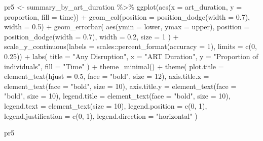 \documentclass[
  letterpaper,
  DIV=11,
  numbers=noendperiod]{scrartcl}
\newenvironment{Shaded}{\begin{snugshade}}{\end{snugshade}}
\newcommand{\AttributeTok}[1]{\textcolor[rgb]{0.40,0.45,0.13}{#1}}
\newcommand{\DecValTok}[1]{\textcolor[rgb]{0.68,0.00,0.00}{#1}}
\newcommand{\FloatTok}[1]{\textcolor[rgb]{0.68,0.00,0.00}{#1}}
\newcommand{\FunctionTok}[1]{\textcolor[rgb]{0.28,0.35,0.67}{#1}}
\newcommand{\NormalTok}[1]{\textcolor[rgb]{0.00,0.23,0.31}{#1}}
\newcommand{\OtherTok}[1]{\textcolor[rgb]{0.00,0.23,0.31}{#1}}
\newcommand{\SpecialCharTok}[1]{\textcolor[rgb]{0.37,0.37,0.37}{#1}}
\newcommand{\StringTok}[1]{\textcolor[rgb]{0.13,0.47,0.30}{#1}}
\begin{document}
\begin{Shaded}
\begin{Highlighting}[]
\NormalTok{pr5 }\OtherTok{\textless{}{-}}\NormalTok{ summary\_by\_art\_duration }\SpecialCharTok{\%\textgreater{}\%} 
\FunctionTok{ggplot}\NormalTok{(}\FunctionTok{aes}\NormalTok{(}\AttributeTok{x =}\NormalTok{ art\_duration, }\AttributeTok{y =}\NormalTok{ proportion, }\AttributeTok{fill =}\NormalTok{ time)) }\SpecialCharTok{+}
  \FunctionTok{geom\_col}\NormalTok{(}\AttributeTok{position =} \FunctionTok{position\_dodge}\NormalTok{(}\AttributeTok{width =} \FloatTok{0.7}\NormalTok{), }\AttributeTok{width =} \FloatTok{0.5}\NormalTok{) }\SpecialCharTok{+}
  \FunctionTok{geom\_errorbar}\NormalTok{(}
    \FunctionTok{aes}\NormalTok{(}\AttributeTok{ymin =}\NormalTok{ lower, }\AttributeTok{ymax =}\NormalTok{ upper),}
    \AttributeTok{position =} \FunctionTok{position\_dodge}\NormalTok{(}\AttributeTok{width =} \FloatTok{0.7}\NormalTok{),}
    \AttributeTok{width =} \FloatTok{0.2}\NormalTok{,}
    \AttributeTok{size =} \DecValTok{1}
\NormalTok{  ) }\SpecialCharTok{+}
  \FunctionTok{scale\_y\_continuous}\NormalTok{(}\AttributeTok{labels =}\NormalTok{ scales}\SpecialCharTok{::}\FunctionTok{percent\_format}\NormalTok{(}\AttributeTok{accuracy =} \DecValTok{1}\NormalTok{), }\AttributeTok{limits =} \FunctionTok{c}\NormalTok{(}\DecValTok{0}\NormalTok{, }\FloatTok{0.25}\NormalTok{)) }\SpecialCharTok{+}
  \FunctionTok{labs}\NormalTok{(}
    \AttributeTok{title =} \StringTok{"Any Disruption"}\NormalTok{,}
    \AttributeTok{x =} \StringTok{"ART Duration"}\NormalTok{,}
    \AttributeTok{y =} \StringTok{"Proportion of individuals"}\NormalTok{,}
    \AttributeTok{fill =} \StringTok{"Time"}
\NormalTok{  ) }\SpecialCharTok{+}
  \FunctionTok{theme\_minimal}\NormalTok{() }\SpecialCharTok{+}
  \FunctionTok{theme}\NormalTok{(}
    \AttributeTok{plot.title =} \FunctionTok{element\_text}\NormalTok{(}\AttributeTok{hjust =} \FloatTok{0.5}\NormalTok{, }\AttributeTok{face =} \StringTok{"bold"}\NormalTok{, }\AttributeTok{size =} \DecValTok{12}\NormalTok{),}
    \AttributeTok{axis.title.x =} \FunctionTok{element\_text}\NormalTok{(}\AttributeTok{face =} \StringTok{"bold"}\NormalTok{, }\AttributeTok{size =} \DecValTok{10}\NormalTok{),}
    \AttributeTok{axis.title.y =} \FunctionTok{element\_text}\NormalTok{(}\AttributeTok{face =} \StringTok{"bold"}\NormalTok{, }\AttributeTok{size =} \DecValTok{10}\NormalTok{),}
    \AttributeTok{legend.title =} \FunctionTok{element\_text}\NormalTok{(}\AttributeTok{face =} \StringTok{"bold"}\NormalTok{, }\AttributeTok{size =} \DecValTok{10}\NormalTok{),}
    \AttributeTok{legend.text =} \FunctionTok{element\_text}\NormalTok{(}\AttributeTok{size =} \DecValTok{10}\NormalTok{),}
    \AttributeTok{legend.position =} \FunctionTok{c}\NormalTok{(}\DecValTok{0}\NormalTok{, }\DecValTok{1}\NormalTok{), }
    \AttributeTok{legend.justification =} \FunctionTok{c}\NormalTok{(}\DecValTok{0}\NormalTok{, }\DecValTok{1}\NormalTok{),}
    \AttributeTok{legend.direction =} \StringTok{"horizontal"}
\NormalTok{  )}

\NormalTok{pr5}
\end{Highlighting}
\end{Shaded}
\end{document}
